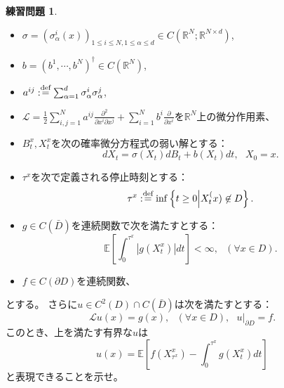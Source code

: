 \documentclass[uplatex]{jsarticle}
\theoremstyle{definition}
\newtheorem{prob}[prob]{練習問題}
\def\R{\mathbb{R}}
\def\E{\mathbb{E}}
\def\mcL{\mathcal{L}}
\def\dfn{:\overset{\mbox{{\scriptsize def}}}{=}}
\begin{document}
\begin{prob}\label{prob: 6.6}
  \
  \begin{itemize}
    \item
    \(\sigma = \left(\sigma_\alpha^i(x)\right)_{1\leq i\leq N, 1\leq \alpha \leq d}
    \in C(\R^N;\R^{N\times d})\),
    \item
    \(b = (b^1,\cdots,b^N)^\dagger \in C(\R^N)\),
    \item
    \(a^{ij}\dfn \sum_{\alpha=1}^d \sigma_\alpha^i\sigma_\alpha^j\),
    \item
    \(\mcL =
    \frac{1}{2}\sum_{i,j=1}^N a^{ij}\frac{\partial^2}{\partial x^i\partial x^j}
    + \sum_{i=1}^N b^i\frac{\partial}{\partial x^i}\)を\(\R^N\)上の微分作用素、
    \item
    \(B_t^x,X_t^x\)を次の確率微分方程式の弱い解とする：
    \[
    dX_t = \sigma(X_t)dB_t + b(X_t)dt, \ \ \ X_0 = x.
    \]
    \item
    \(\tau^x\)を次で定義される停止時刻とする：
    \[
    \tau^x \dfn \inf\left\{ t\geq 0 \middle| X_t^(x) \not\in D\right\}.
    \]
    \item
    \(g\in C(\bar{D})\)を連続関数で次を満たすとする：
    \[
    \E\left[ \int_0^{\tau^x}|g(X_t^x)|dt \right] < \infty , \ \ \ (\forall x\in D).
    \]
    \item
    \(f\in C(\partial D)\)を連続関数、
  \end{itemize}
  とする。
  さらに\(u\in C^2(D)\cap C(\bar{D})\)は次を満たすとする：
  \[
  \mcL u(x) = g(x), \ \ \ (\forall x\in D), \ \ \
  u|_{\partial D} = f.
  \]
  このとき、上を満たす有界な\(u\)は
  \[
  u(x) = \E \left[ f(X_{\tau^x}^x) - \int_0^{\tau^x}g(X_t^x)dt \right]
  \]
  と表現できることを示せ。
\end{prob}
\end{document}
